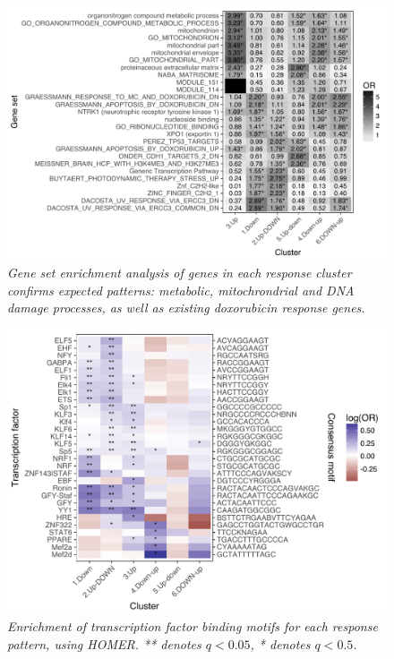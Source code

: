 \documentclass{article}
\begin{document}
\begin{figure}[h]
\begin{center}
    \includegraphics[width=1\textwidth]{../figures/cluster_go.pdf} %
    \caption{\it{Gene set enrichment analysis of genes in each response cluster confirms expected patterns: metabolic, mitochrondrial and DNA damage processes, as well as existing doxorubicin response genes.}}
    \label{fig:go}
    \end{center}
\end{figure}

\begin{figure}[h]
\begin{center}
    \includegraphics[width=1\textwidth]{../figures/cluster_tf.pdf} %
    \caption{\it{Enrichment of transcription factor binding motifs for each response pattern, using HOMER. ** denotes $q<0.05$, * denotes $q<0.5$.}}
    \label{fig:tf}
    \end{center}
\end{figure}
\end{document}
